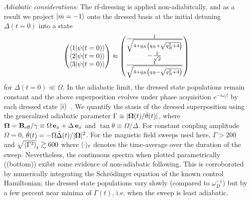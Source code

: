 \documentclass[aps,prl,reprint,superscriptaddress,floatfix]{revtex4-1}
\begin{document}
\textit{Adiabatic considerations:}
The rf-dressing is applied non-adiabitcally, and as a result we project $\vert m=-1 \rangle $ onto the dressed basis at the initial detuning $\Delta(t=0)$ into a state
\begin{equation*}
    \begin{pmatrix}
        \langle 1 \vert \psi(t=0) \rangle  \\
        \langle 2 \vert \psi(t=0) \rangle  \\
        \langle 3 \vert \psi(t=0) \rangle  
    \end{pmatrix} \approx 
    \begin{pmatrix}
        \frac{1}{\sqrt{4 + q_R \left(q_R + \sqrt{q_R^2+4}\right)}} \\
        -\frac{1}{\sqrt{2}} \\
        \frac{1}{\sqrt{4 + q_R \left(q_R - \sqrt{q_R^2+4}\right)}}
    \end{pmatrix}
\end{equation*}
for $\Delta(t=0) \ll \Omega$.
In the adiabatic limit, the dressed state populations remain constant and the above superposition evolves under phase acquisition $e^{-i \omega_i t}$ by each dressed state $\vert i \rangle $~\cite{messiah_quantum_1962}. 
We quantify the stasis of the dressed superposition using the generalized adiabatic parameter $\Gamma \equiv \vert \mathbf{\Omega}(t)/\dot{\theta}(t) \vert $, where $\mathbf{\Omega} = \mathbf{B}_{\text{eff}} / \gamma \equiv \Omega \, \mathbf{e}_x + \Delta \, \mathbf{e}_x$ and $\tan \theta \equiv \Omega / \Delta$.
For constant coupling amplitude $\dot{\Omega} = 0$, $\dot{\theta}(t) = -\Omega \dot{\Delta}(t)/\vert \mathbf{\Omega} \vert ^2$.
For the magnetic field sweeps used here, $\Gamma > 200$ and $\sqrt{\langle \Gamma^2 \rangle}_t \gtrsim 600$ where $\langle \cdot \rangle_t$ denotes the time-average over the duration of the sweep.
Nevertheless, the continuous spectra when plotted parametrically ((bottom)) exibit some evidence of non-adiabatic following.
This is corroborated by numerically integrating the Schr\"{o}dinger equation of the known control Hamiltonian; the dressed state populations vary slowly (compared to $\omega_D^{-1}$) but by a few percent near minima of $\Gamma(t)$, i.e. when the sweep is least adiabatic.
\end{document}
